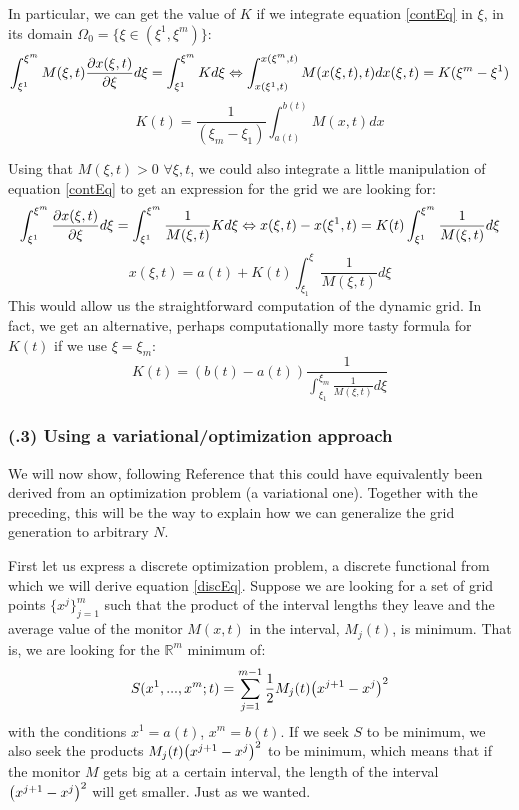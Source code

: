 \documentclass[11pt, a4paper]{article} %
\newcommand{\R}{\mathbb{R}} %
\begin{document}
In particular, we can get the value of $K$ if we integrate equation \eqref{contEq} in $\xi$, in its domain $\Omega_0=\{\xi\in(\xi^1,\xi^m)\}$:
\begin{equation}
\int^{\xi^m}_{\xi^1} M(\xi,t) \pdv{x(\xi,t)}{\xi} d\xi=\int^{\xi^m}_{\xi^1} K d \xi  \Leftrightarrow \int^{x(\xi^m,t)}_{x(\xi^1,t)} M(x(\xi,t),t) dx(\xi,t)=K(\xi^m-\xi^1)
\end{equation}
\begin{equation}
K(t)=\frac{1}{(\xi_m-\xi_1)}\int^{b(t)}_{a(t)} M(x,t) dx
\end{equation}

Using that $M(\xi,t)>0$ $\forall \xi,t$, we could also integrate a little manipulation of equation \eqref{contEq} to get an expression for the grid we are looking for:
\begin{equation}
\int^{\xi^m}_{\xi^1}  \pdv{x(\xi,t)}{\xi} d\xi=\int^{\xi^m}_{\xi^1} \frac{1}{M(\xi,t)} K d \xi  \Leftrightarrow x(\xi,t)-x(\xi^1,t) =K(t)\int^{\xi^m}_{\xi^1} \frac{1}{M(\xi,t)}  d \xi
\end{equation}
\begin{equation}
x(\xi,t)=a(t)+K(t)\int^\xi_{\xi_1} \frac{1}{M(\xi,t)}d\xi
\end{equation}
This would allow us the straightforward computation of the dynamic grid. In fact, we get an alternative, perhaps computationally more tasty formula for $K(t)$ if we use $\xi=\xi_m$:
\begin{equation}
K(t)=(b(t)-a(t))\frac{1}{\int^{\xi_m}_{\xi_1} \frac{1}{M(\xi,t)}d\xi}
\end{equation}

\subsubsection*{\bf (\textgamma.3) Using a variational/optimization approach}
We will now show, following Reference \cite{movingGrids} that this could have equivalently been derived from an optimization problem (a variational one). Together with the preceding, this will be the way to explain how we can generalize the grid generation to arbitrary $N$.

First let us express a discrete optimization problem, a discrete functional from which we will derive equation \eqref{discEq}. Suppose we are looking for a set of grid points $\{x^j \}_{j=1}^m$ such that the product of the interval lengths they leave and the average value of the monitor $M(x,t)$ in the interval, $M_j(t)$, is minimum. That is, we are looking for the $\R^m$ minimum of: 
\begin{equation}\label{discFunc}
S( x^1,...,x^m;t)=\sum_{j=1}^{m-1} \frac{1}{2} M_j(t) \qty(x^{j+1}-x^j)^2
\end{equation}
with the conditions $x^1=a(t)$, $x^m=b(t)$. If we seek $S$ to be minimum, we also seek the products $M_j(t) \qty(x^{j+1}-x^j)^2$ to be minimum, which means that if the monitor $M$ gets big at a certain interval, the length of the interval $\qty(x^{j+1}-x^j)^2$ will get smaller. Just as we wanted.
\end{document}

